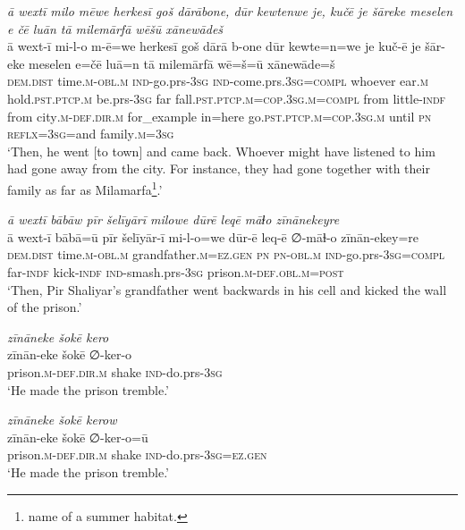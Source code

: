 \ea \label{BP.167}
\textit{ā wextī milo mēwe herkesī goš dārābone, dūr kewtenwe je, kučē je šāreke meselen e čē luān tā milemārfā wēšū xānewādeš} \\ 
\gll ā wext-ī mi-l-o m-ē=we herkesī goš dārā b-one dūr kewte=n=we je kuč-ē je šār-eke meselen e=čē luā=n tā milemārfā wē=š=ū xānewāde=š \\ 
 \textsc{dem.dist} time\textsc{.m}\textsc{-obl}\textsc{.m} \textsc{ind-}go.prs\textsc{-3sg} \textsc{ind-}come.prs\textsc{.3sg}\textsc{=compl} whoever ear\textsc{.m} hold\textsc{.pst}\textsc{.ptcp}\textsc{.m} be.prs\textsc{-3sg} far fall\textsc{.pst}\textsc{.ptcp}\textsc{.m}\textsc{=cop}\textsc{.3sg}\textsc{.m}\textsc{=compl} from little\textsc{-indf} from city\textsc{.m}\textsc{-def}\textsc{.dir}\textsc{.m} for\_example in=here go\textsc{.pst}\textsc{.ptcp}\textsc{.m}\textsc{=cop}\textsc{.3sg}\textsc{.m} until \textsc{pn} \textsc{reflx}\textsc{=3sg}=and family\textsc{.m}\textsc{=3sg} \\ 
\glt `Then, he went [to town] and came back. Whoever might have listened to him had gone away from the city. For instance, they had gone together with their family as far as Milamarfa\footnote{name of a summer habitat.}.'
\z 
 
\ea \label{BP.168}
\textit{ā wextī bābāw pīr šelīyārī milowe dūrē leqē māɫo zīnānekeyre} \\ 
\gll ā wext-ī bābā=ū pīr šelīyār-ī mi-l-o=we dūr-ē leq-ē ∅-māɫ-o zīnān-ekey=re \\ 
 \textsc{dem.dist} time\textsc{.m}\textsc{-obl}\textsc{.m} grandfather\textsc{.m}\textsc{=ez.gen} \textsc{pn} \textsc{pn}\textsc{-obl}\textsc{.m} \textsc{ind-}go.prs\textsc{-3sg}\textsc{=compl} far\textsc{-indf} kick\textsc{-indf} \textsc{ind-}smash.prs\textsc{-3sg} prison\textsc{.m}\textsc{-def}\textsc{.obl}\textsc{.m}\textsc{=\textsc{post}} \\ 
\glt `Then, Pir Shaliyar’s grandfather went backwards in his cell and kicked the wall of the prison.'
\z 
 
\ea \label{BP.169}
\textit{zīnāneke šokē kero} \\ 
\gll zīnān-eke šokē ∅-ker-o \\ 
 prison\textsc{.m}\textsc{-def}\textsc{.dir}\textsc{.m} shake \textsc{ind-}do.prs\textsc{-3sg} \\ 
\glt `He made the prison tremble.'
\z 
 
\ea \label{BP.170}
\textit{zīnāneke šokē kerow} \\ 
\gll zīnān-eke šokē ∅-ker-o=ū \\ 
 prison\textsc{.m}\textsc{-def}\textsc{.dir}\textsc{.m} shake \textsc{ind-}do.prs\textsc{-3sg}\textsc{=ez.gen} \\ 
\glt `He made the prison tremble.'
\z 
 
